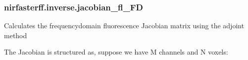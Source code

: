 \documentclass[letterpaper,10pt,english]{sphinxmanual}
\begin{document}
\sphinxstepscope


\subsubsection{nirfasterff.inverse.jacobian\_fl\_FD}
\label{\detokenize{_autosummary/nirfasterff.inverse.jacobian_fl_FD:nirfasterff-inverse-jacobian-fl-fd}}\label{\detokenize{_autosummary/nirfasterff.inverse.jacobian_fl_FD::doc}}

\begin{fulllineitems}
\label{\detokenize{_autosummary/nirfasterff.inverse.jacobian_fl_FD:nirfasterff.inverse.jacobian_fl_FD}}
\pysigstartsignatures
{}
\pysigstopsignatures
\sphinxAtStartPar
Calculates the frequency\sphinxhyphen{}domain fluorescence Jacobian matrix using the adjoint method

\sphinxAtStartPar
The Jacobian is structured as, suppose we have M channels and N voxels:


\end{fulllineitems}
\end{document}
